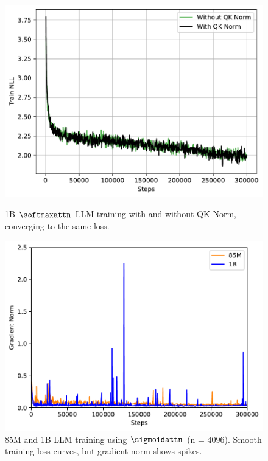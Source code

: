 \begin{figure}[h]
    \centering
    \begin{minipage}{0.46\textwidth}
        \footnotesize
        \centering
        \includegraphics[trim={0 0 0 0}, width=\textwidth]{
            figures/llm/1b_qknorm.pdf
        }
        \captionsetup{justification=centering}
        \caption{
            1B $\softmaxattn$ LLM training with and without QK Norm, converging to the same loss.
        }
        \label{fig:lm_1b_qknorm}
    \end{minipage}
    \hfill
    \begin{minipage}{0.46\textwidth}
        \centering        
        \includegraphics[trim={0 0 0 0}, width=\textwidth]{
            figures/llm/grad_norm.pdf
        }
        \captionsetup{justification=centering} 
        \caption{85M and 1B LLM training using $\sigmoidattn$ (n = 4096). Smooth training loss curves, but gradient norm shows spikes.}
        \label{fig:lm_grad_norm}
    \end{minipage}
\end{figure}
